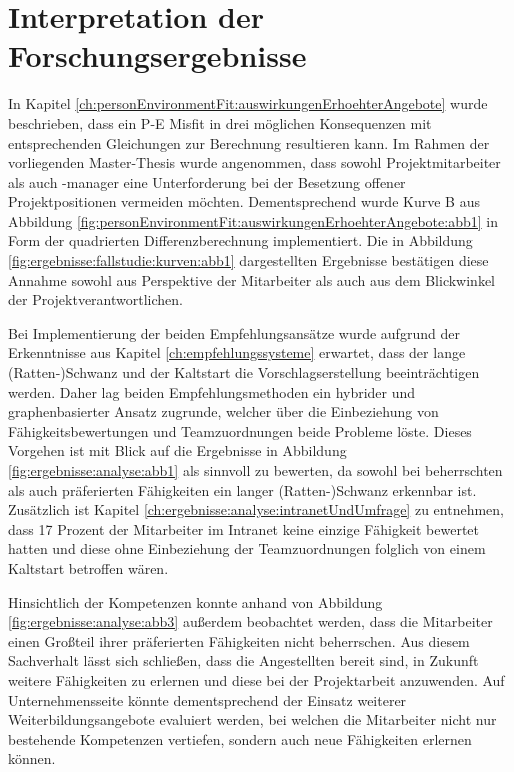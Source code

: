 \section{Interpretation der Forschungsergebnisse}
\label{ch:diskussion:interpretation}
In Kapitel \ref{ch:personEnvironmentFit:auswirkungenErhoehterAngebote} wurde beschrieben, dass ein P-E Misfit in drei möglichen Konsequenzen mit entsprechenden Gleichungen zur Berechnung resultieren kann. Im Rahmen der vorliegenden Master-Thesis wurde angenommen, dass sowohl Projektmitarbeiter als auch -manager eine Unterforderung bei der Besetzung offener Projektpositionen vermeiden möchten. Dementsprechend wurde Kurve B aus Abbildung \ref{fig:personEnvironmentFit:auswirkungenErhoehterAngebote:abb1} in Form der quadrierten Differenzberechnung implementiert. Die in Abbildung \ref{fig:ergebnisse:fallstudie:kurven:abb1} dargestellten Ergebnisse bestätigen diese Annahme sowohl aus Perspektive der Mitarbeiter als auch aus dem Blickwinkel der Projektverantwortlichen. 

Bei Implementierung der beiden Empfehlungsansätze wurde aufgrund der Erkenntnisse aus Kapitel \ref{ch:empfehlungssysteme} erwartet, dass der lange (Ratten-)Schwanz und der Kaltstart die Vorschlagserstellung beeinträchtigen werden. Daher lag beiden Empfehlungsmethoden ein hybrider und graphenbasierter Ansatz zugrunde, welcher über die Einbeziehung von Fähigkeitsbewertungen und Teamzuordnungen beide Probleme löste. Dieses Vorgehen ist mit Blick auf die Ergebnisse in Abbildung \ref{fig:ergebnisse:analyse:abb1} als sinnvoll zu bewerten, da sowohl bei beherrschten als auch präferierten Fähigkeiten ein langer (Ratten-)Schwanz erkennbar ist. Zusätzlich ist Kapitel \ref{ch:ergebnisse:analyse:intranetUndUmfrage} zu entnehmen, dass 17 Prozent der Mitarbeiter im Intranet keine einzige Fähigkeit bewertet hatten und diese ohne Einbeziehung der Teamzuordnungen folglich von einem Kaltstart betroffen wären.

Hinsichtlich der Kompetenzen konnte anhand von Abbildung \ref{fig:ergebnisse:analyse:abb3} außerdem beobachtet werden, dass die Mitarbeiter einen Großteil ihrer präferierten Fähigkeiten nicht beherrschen. Aus diesem Sachverhalt lässt sich schließen, dass die Angestellten bereit sind, in Zukunft weitere Fähigkeiten zu erlernen und diese bei der Projektarbeit anzuwenden. Auf Unternehmensseite könnte dementsprechend der Einsatz weiterer Weiterbildungsangebote evaluiert werden, bei welchen die Mitarbeiter nicht nur bestehende Kompetenzen vertiefen, sondern auch neue Fähigkeiten erlernen können.

